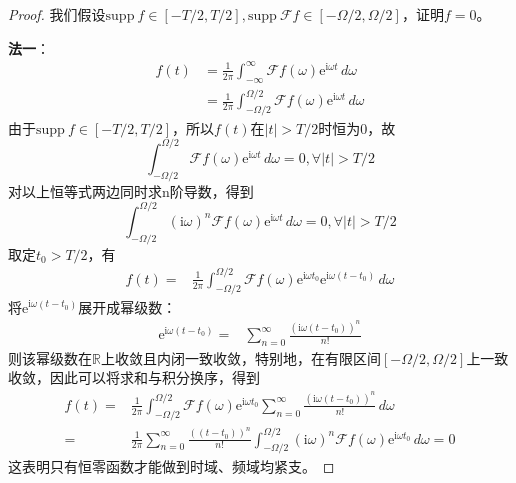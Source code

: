 \documentclass{ctexbook}
\begin{document}
\begin{proof}
我们假设$\text{supp}\ f\in[-T/2,T/2],\text{supp}\ \mathcal{F} f\in[-\Omega/2,\Omega/2]$，证明$f=0$。

\textbf{法一}：
\begin{align*}
    f(t)&=\frac{1}{2\pi}\int_{-\infty}^{\infty}\mathcal{F} f(\omega)\mathrm{e}^{\mathrm{i}\omega t}\,d\omega\\
    &=\frac{1}{2\pi}\int_{-\Omega/2}^{\Omega/2}\mathcal{F} f(\omega)\mathrm{e}^{\mathrm{i}\omega t}\,d\omega
\end{align*}
由于$\text{supp}\ f\in[-T/2,T/2]$，所以$f(t)$在$|t|>T/2$时恒为0，故\[\int_{-\Omega/2}^{\Omega/2}\mathcal{F} f(\omega)\mathrm{e}^{\mathrm{i}\omega t}\,d\omega=0,\forall |t|>T/2\]
对以上恒等式两边同时求n阶导数，得到\[\int_{-\Omega/2}^{\Omega/2}(\mathrm{i}\omega)^n \mathcal{F} f(\omega)\mathrm{e}^{\mathrm{i}\omega t}\,d\omega=0,\forall |t|>T/2\]
取定$t_0>T/2$，有\begin{align*}
    f(t)=&\frac{1}{2\pi}\int_{-\Omega/2}^{\Omega/2}\mathcal{F} f(\omega)\mathrm{e}^{\mathrm{i}\omega t_0}\mathrm{e}^{\mathrm{i}\omega (t-t_0)}\,d\omega
\end{align*}
将$\mathrm{e}^{\mathrm{i}\omega (t-t_0)}$展开成幂级数：\begin{align*}
    \mathrm{e}^{\mathrm{i}\omega (t-t_0)}=&\sum_{n=0}^{\infty}\frac{(\mathrm{i}\omega (t-t_0))^n}{n!}
\end{align*}
则该幂级数在$\mathbb{R}$上收敛且内闭一致收敛，特别地，在有限区间$[-\Omega/2,\Omega/2]$上一致收敛，因此可以将求和与积分换序，得到\begin{align*}
    f(t)=&\frac{1}{2\pi}\int_{-\Omega/2}^{\Omega/2}\mathcal{F} f(\omega)\mathrm{e}^{\mathrm{i}\omega t_0}\sum_{n=0}^{\infty}\frac{(\mathrm{i}\omega (t-t_0))^n}{n!}\,d\omega\\
    =&\frac{1}{2\pi}\sum_{n=0}^{\infty}\frac{((t-t_0))^n}{n!}\int_{-\Omega/2}^{\Omega/2}(\mathrm{i}\omega)^n \mathcal{F} f(\omega)\mathrm{e}^{\mathrm{i}\omega t_0}\,d\omega=0
\end{align*}
这表明只有恒零函数才能做到时域、频域均紧支。


\end{proof}
\end{document}

